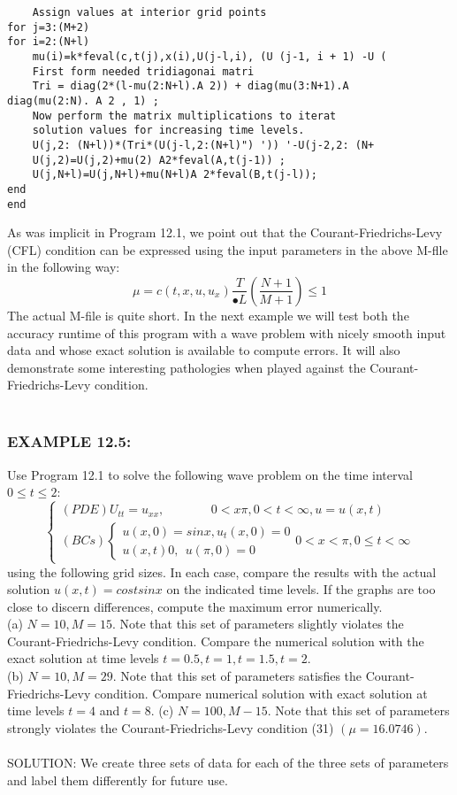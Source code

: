 \documentclass[../main.tex]{subfiles}
\begin{document}
{{\begin{lstlisting}
	Assign values at interior grid points 
for j=3:(M+2) 
for i=2:(N+l) 
	mu(i)=k*feval(c,t(j),x(i),U(j-l,i), (U (j-1, i + 1) -U ( 
	First form needed tridiagonai matri 
	Tri = diag(2*(l-mu(2:N+l).A 2)) + diag(mu(3:N+1).A 
diag(mu(2:N). A 2 , 1) ; 
	Now perform the matrix multiplications to iterat 
	solution values for increasing time levels. 
	U(j,2: (N+l))*(Tri*(U(j-l,2:(N+l)") ')) '-U(j-2,2: (N+ 
	U(j,2)=U(j,2)+mu(2) A2*feval(A,t(j-1)) ; 
	U(j,N+l)=U(j,N+l)+mu(N+l)A 2*feval(B,t(j-l)); 
end 
end 
\end{lstlisting}
As was implicit in Program 12.1, we point out that the Courant-Friedrichs-Levy (CFL) condition can be expressed using the input parameters in the above M-flle in the following way: 
\begin{equation}
	\mu=c(t,x,u,u_x)\dfrac{T}{•L}(\dfrac{N+1}{M+1})\leqslant 1
\end{equation}
The actual M-file is quite short. In the next example we will test both the accuracy  runtime of this program with a wave problem with nicely smooth input data and whose exact solution is available to compute errors. It will also demonstrate some interesting pathologies when played against the Courant-Friedrichs-Levy condition. 
\\
\\
\subsubsection{EXAMPLE 12.5:} Use Program 12.1 to solve the following wave problem on the time interval $0 \leqslant t \leqslant 2$: 
$$\begin{cases} 
	(PDE) U_{tt}=u_{xx}, ~~~~~~~~~~~~~~~~~ 0<x\pi , 0<t<\infty, u=u(x,t)\\ 
	(BCs)
	\begin{cases} 
	u(x,0)=sin x, u_t(x,0)=0\\
	u(x,t)0, ~~ u(\pi , 0)=0
	\end{cases}
	0<x<\pi, 0\leqslant t< \infty 
\end{cases}$$
using the following grid sizes. In each case, compare the results with the actual solution $u(x,t) = cos t sin x$ on the indicated time levels. If the graphs are too close to discern differences, compute the maximum error numerically.
\\
(a) $N= 10, M= 15$. Note that this set of parameters slightly violates the Courant-Friedrichs-Levy condition. Compare the numerical solution with the exact solution at time levels $t = 0.5, t = 1, t = 1.5, t = 2$. 
\\
(b) $N = 10, M = 29$. Note that this set of parameters satisfies the Courant-Friedrichs-Levy condition. Compare numerical solution with exact solution at time 
levels $t = 4$ and $t= 8$. 
(c) $N = 100, M - 15$. Note that this set of parameters strongly violates the Courant-Friedrichs-Levy condition (31) $(\mu = 16.0746)$.
\\
\\
SOLUTION: We create three sets of data for each of the three sets of parameters and label them differently for future use. 
\\

}}
\end{document}
